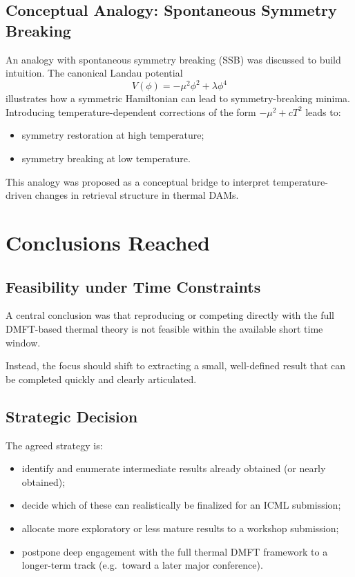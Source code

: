 \documentclass[11pt,a4paper]{article}
\begin{document}
\subsection{Conceptual Analogy: Spontaneous Symmetry Breaking}

An analogy with spontaneous symmetry breaking (SSB) was discussed to build intuition. The canonical Landau potential
\[
V(\phi) = -\mu^2\phi^2 + \lambda\phi^4
\]
illustrates how a symmetric Hamiltonian can lead to symmetry-breaking minima. Introducing temperature-dependent corrections of the form \(-\mu^2 + cT^2\) leads to:
\begin{itemize}
    \item symmetry restoration at high temperature;
    \item symmetry breaking at low temperature.
\end{itemize}

This analogy was proposed as a conceptual bridge to interpret temperature-driven changes in retrieval structure in thermal DAMs.

\section{Conclusions Reached}

\subsection{Feasibility under Time Constraints}

A central conclusion was that reproducing or competing directly with the full DMFT-based thermal theory is not feasible within the available short time window.

Instead, the focus should shift to extracting a small, well-defined result that can be completed quickly and clearly articulated.

\subsection{Strategic Decision}

The agreed strategy is:
\begin{itemize}
    \item identify and enumerate intermediate results already obtained (or nearly obtained);
    \item decide which of these can realistically be finalized for an ICML submission;
    \item allocate more exploratory or less mature results to a workshop submission;
    \item postpone deep engagement with the full thermal DMFT framework to a longer-term track (e.g.\ toward a later major conference).
\end{itemize}
\end{document}
